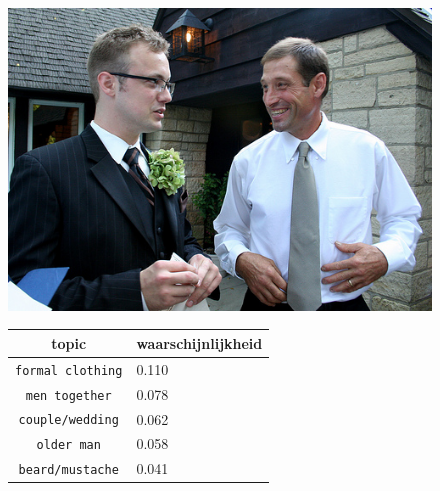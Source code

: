 \begin{figure}[h]
    \centering
    \begin{minipage}[t]{.5\linewidth}
    \centering
    \vspace{0pt}
    \includegraphics[width=\textwidth]{Images/LDA/2773744784.jpg}
    \end{minipage}\hfill
    \begin{minipage}[t]{.5\textwidth}
    \centering
    \vspace{0pt}
    \begin{tabular}{cl}
            topic                           & waarschijnlijkheid\\
            \hline
            \texttt{formal clothing}             & 0.110 \\
            \texttt{men together}                   & 0.078 \\
            \texttt{couple/wedding}                 & 0.062 \\
            \texttt{older man}           & 0.058 \\
            \texttt{beard/mustache}        & 0.041\\
            \hline
        \end{tabular}
    \end{minipage}
\end{figure}


